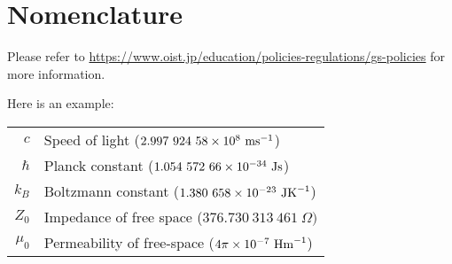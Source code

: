 \chapter*{Nomenclature}

Please refer to \url{https://www.oist.jp/education/policies-regulations/gs-policies} for more information.

Here is an example:

\begin{longtable}{rl}
    $c$     & Speed of light ($2.997\ 924\ 58 \times 10^{8}\ \mbox{ms}^{-1}$)    \\
    $\hbar$ & Planck constant ($1.054\ 572\ 66\times 10^{-34}\ \mbox{Js}$)       \\
    $k_B$   & Boltzmann constant  ($1.380\ 658\times 10^{-23}\ \mbox{JK}^{-1} $) \\
    $Z_0$   & Impedance of free space  ($376.730\ 313\ 461\ \Omega) $    \\
    $\mu_0$ & Permeability of free-space ($4\pi\times 10^{-7}\ \mbox{Hm}^{-1}$)  \\
\end{longtable}

